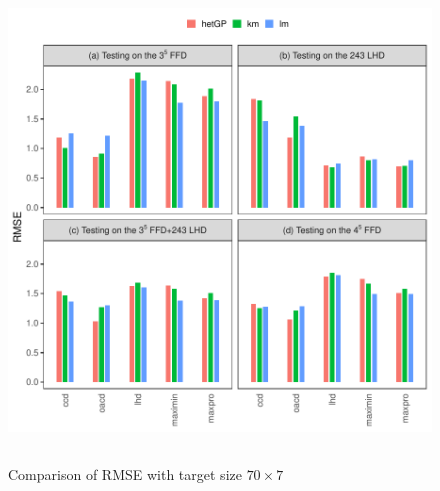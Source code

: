 \documentclass [PhD] {package/uclathes}
\begin{document}
\begin{figure}%
\centering
\includegraphics[height=5in, width=6in]{chapters/DE/pdfs/barplots3}
\caption{Comparison of RMSE with target size $70\times7$}
\label{barplots3}
\end{figure}
\end{document}
